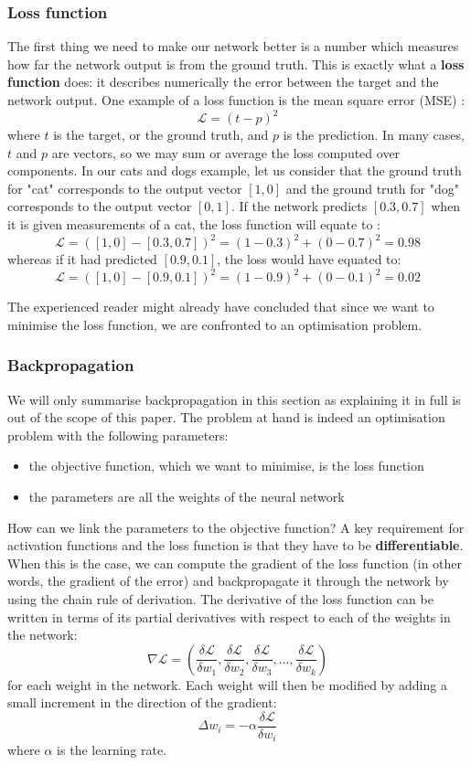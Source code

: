 \subsubsection{Loss function}
The first thing we need to make our network better is a number which measures
how far the network output is from the ground truth.
This is exactly what a \textbf{loss function}  does: 
it describes numerically the error between the target and the network output.
One example of a loss function is the mean square error (MSE) :
$$ \mathcal{L} = (t-p)^2$$
where $t$ is the target, or the ground truth, and $p$ is the prediction. In
many cases, $t$ and $p$ are vectors, so we may sum or average the loss computed
over components.
In our cats and dogs example, let us consider that the ground truth for
"cat" corresponds to the output vector $[1, 0]$ and the ground truth for "dog"
corresponds to the output vector $[0, 1]$. If the network predicts $[0.3, 0.7]$
when it is given measurements of a cat, the loss function will equate to :
$$ \mathcal{L} = ([1, 0]-[0.3, 0.7])^2 = (1-0.3)^2 + (0-0.7)^2 = 0.98$$
whereas if it had predicted $[0.9, 0.1]$, the loss would have equated to:
$$ \mathcal{L} = ([1, 0]-[0.9, 0.1])^2 = (1-0.9)^2 + (0-0.1)^2 = 0.02$$

The experienced reader might already have concluded that since we want to
minimise the loss function, we are confronted to an optimisation problem.

\subsubsection{Backpropagation}
We will only summarise backpropagation in this section as explaining it in
full is out of the scope of this paper.
The problem at hand is indeed an optimisation problem with the following
parameters:
\begin{itemize}
	\item the objective function, which we want to minimise, is the loss 
		function
	\item the parameters are all the weights of the neural network
\end{itemize}
How can we link the parameters to the objective function? A key requirement
for activation functions and the loss function is that they have to be
\textbf{differentiable}. When this is the case, we can compute the gradient
of the loss function (in other words, the gradient of the error) and 
backpropagate it through the network by using the
chain rule of derivation. The derivative of the loss function can be written
in terms of its partial derivatives with respect to each of the weights
in the network:
$$\nabla\mathcal{L} = \left(
  \frac{\delta\mathcal{L}}{\delta w_1}, 
  \frac{\delta\mathcal{L}}{\delta w_2}, 
  \frac{\delta\mathcal{L}}{\delta w_3}, ...,
  \frac{\delta\mathcal{L}}{\delta w_k}\right) 
$$
for each weight in the network. Each weight will then be modified by adding
a small increment in the direction of the gradient:
$$ \Delta w_i = - \alpha \frac{\delta\mathcal{L}}{\delta w_i}$$
where $\alpha$ is the learning rate.\\

